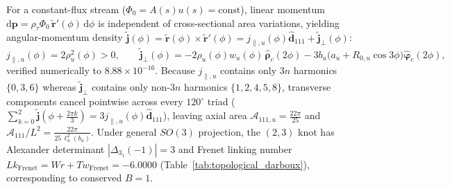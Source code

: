\documentclass[11pt, a4paper]{article}
\DeclareRobustCommand{\dd}{\mathrm{d}}
\begin{document}
For a constant-flux stream ($\Phi_0 = A(s)u(s) = \text{const}$), linear momentum $\dd\mathbf{p} = \rho_\tau\Phi_0\,\tilde{\mathbf{r}}'(\phi)\,\dd\phi$ is independent of cross-sectional area variations, yielding angular-momentum density $\tilde{\mathbf{j}}(\phi) = \tilde{\mathbf{r}}(\phi)\times\tilde{\mathbf{r}}'(\phi) = j_{\parallel,u}(\phi)\hat{\mathbf{d}}_{111} + \tilde{\mathbf{j}}_\perp(\phi)$:
\begin{equation}
    j_{\parallel,u}(\phi) = 2\rho_u^2(\phi) > 0, \qquad
    \tilde{\mathbf{j}}_\perp(\phi) = -2\rho_u(\phi)w_u(\phi)\,\hat{\boldsymbol{\rho}}_c(2\phi) - 3b_u\big(a_u + R_{0,u}\cos 3\phi\big)\hat{\boldsymbol{\varphi}}_c(2\phi),
    \label{eq:j_perp_exact}
\end{equation}
verified numerically to $8.88 \times 10^{-16}$. Because $j_{\parallel,u}$ contains only $3n$ harmonics $\{0,3,6\}$ whereas $\tilde{\mathbf{j}}_\perp$ contains only non-$3n$ harmonics $\{1,2,4,5,8\}$, transverse components cancel pointwise across every $120^\circ$ triad ($\sum_{k=0}^2 \tilde{\mathbf{j}}(\phi + \frac{2\pi k}{3}) = 3j_{\parallel,u}(\phi)\hat{\mathbf{d}}_{111}$), leaving axial area $\mathcal{A}_{111,u} = \frac{22\pi}{25}$ and $\mathcal{A}_{111}/L^2 = \frac{22\pi}{25\,\ell_u^2(b_u)}$. Under general $SO(3)$ projection, the $(2,3)$ knot has Alexander determinant $|\Delta_{3_1}(-1)| = 3$ and Frenet linking number~\cite{calugareanu1959,gauss1833} $Lk_{\mathrm{Frenet}} = Wr + Tw_{\mathrm{Frenet}} = -6.0000$ (Table~\ref{tab:topological_darboux}), corresponding to conserved $B = 1$.
\end{document}
